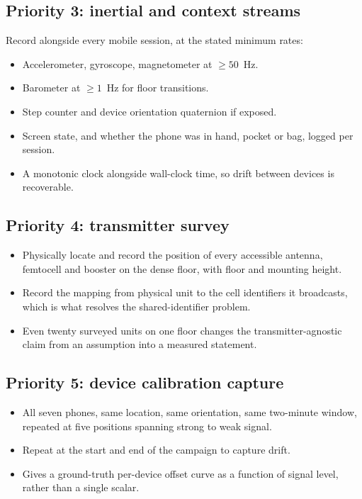 \documentclass[11pt,a4paper]{article}
\begin{document}
\subsection{Priority 3: inertial and context streams}

Record alongside every mobile session, at the stated minimum rates:

\begin{itemize}
\item Accelerometer, gyroscope, magnetometer at $\ge 50$~Hz.
\item Barometer at $\ge 1$~Hz for floor transitions.
\item Step counter and device orientation quaternion if exposed.
\item Screen state, and whether the phone was in hand, pocket or bag, logged per session.
\item A monotonic clock alongside wall-clock time, so drift between devices is
recoverable.
\end{itemize}

\subsection{Priority 4: transmitter survey}

\begin{itemize}
\item Physically locate and record the position of every accessible antenna, femtocell
and booster on the dense floor, with floor and mounting height.
\item Record the mapping from physical unit to the cell identifiers it broadcasts, which
is what resolves the shared-identifier problem.
\item Even twenty surveyed units on one floor changes the transmitter-agnostic claim from
an assumption into a measured statement.
\end{itemize}

\subsection{Priority 5: device calibration capture}

\begin{itemize}
\item All seven phones, same location, same orientation, same two-minute window,
repeated at five positions spanning strong to weak signal.
\item Repeat at the start and end of the campaign to capture drift.
\item Gives a ground-truth per-device offset curve as a function of signal level, rather
than a single scalar.
\end{itemize}
\end{document}
